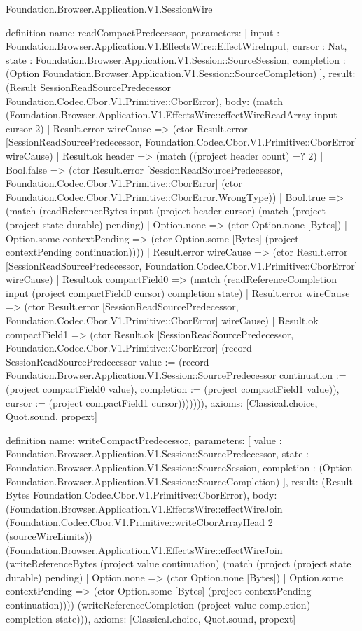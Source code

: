 \begin{lexlean}{Foundation.Browser.Application.V1.SessionWire}
\begin{semanticmodule}
definition{
  name: readCompactPredecessor,
  parameters: [
    input : Foundation.Browser.Application.V1.EffectsWire::EffectWireInput,
    cursor : Nat,
    state : Foundation.Browser.Application.V1.Session::SourceSession,
    completion : (Option Foundation.Browser.Application.V1.Session::SourceCompletion)
  ],
  result: (Result SessionReadSourcePredecessor Foundation.Codec.Cbor.V1.Primitive::CborError),
  body: (match (Foundation.Browser.Application.V1.EffectsWire::effectWireReadArray input cursor 2)
    | Result.error wireCause => (ctor Result.error [SessionReadSourcePredecessor, Foundation.Codec.Cbor.V1.Primitive::CborError] wireCause)
    | Result.ok header => (match ((project header count) =? 2)
      | Bool.false => (ctor Result.error [SessionReadSourcePredecessor, Foundation.Codec.Cbor.V1.Primitive::CborError] (ctor Foundation.Codec.Cbor.V1.Primitive::CborError.WrongType))
      | Bool.true => (match (readReferenceBytes input (project header cursor) (match (project (project state durable) pending)
          | Option.none => (ctor Option.none [Bytes])
          | Option.some contextPending => (ctor Option.some [Bytes] (project contextPending continuation))))
        | Result.error wireCause => (ctor Result.error [SessionReadSourcePredecessor, Foundation.Codec.Cbor.V1.Primitive::CborError] wireCause)
        | Result.ok compactField0 => (match (readReferenceCompletion input (project compactField0 cursor) completion state)
          | Result.error wireCause => (ctor Result.error [SessionReadSourcePredecessor, Foundation.Codec.Cbor.V1.Primitive::CborError] wireCause)
          | Result.ok compactField1 => (ctor Result.ok [SessionReadSourcePredecessor, Foundation.Codec.Cbor.V1.Primitive::CborError] (record SessionReadSourcePredecessor {value := (record Foundation.Browser.Application.V1.Session::SourcePredecessor {continuation := (project compactField0 value), completion := (project compactField1 value)}), cursor := (project compactField1 cursor)})))))),
  axioms: [Classical.choice, Quot.sound, propext]
}

definition{
  name: writeCompactPredecessor,
  parameters: [
    value : Foundation.Browser.Application.V1.Session::SourcePredecessor,
    state : Foundation.Browser.Application.V1.Session::SourceSession,
    completion : (Option Foundation.Browser.Application.V1.Session::SourceCompletion)
  ],
  result: (Result Bytes Foundation.Codec.Cbor.V1.Primitive::CborError),
  body: (Foundation.Browser.Application.V1.EffectsWire::effectWireJoin (Foundation.Codec.Cbor.V1.Primitive::writeCborArrayHead 2 (sourceWireLimits)) (Foundation.Browser.Application.V1.EffectsWire::effectWireJoin (writeReferenceBytes (project value continuation) (match (project (project state durable) pending)
    | Option.none => (ctor Option.none [Bytes])
    | Option.some contextPending => (ctor Option.some [Bytes] (project contextPending continuation)))) (writeReferenceCompletion (project value completion) completion state))),
  axioms: [Classical.choice, Quot.sound, propext]
}


\end{semanticmodule}
\end{lexlean}
